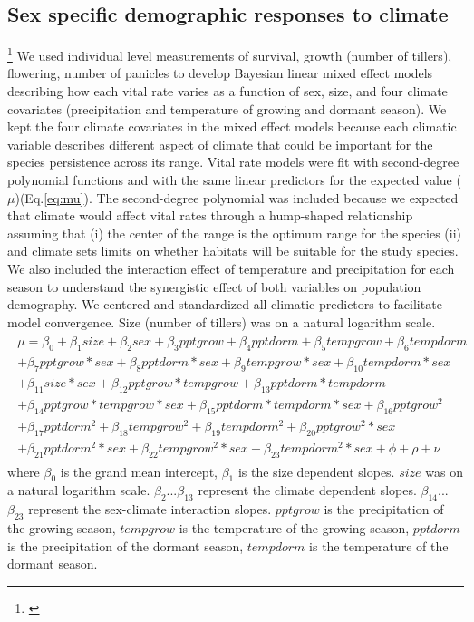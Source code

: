 \documentclass[12pt]{article}
\newcommand{\jacob}[2]{{\color{blue}{#1}}\footnote{\textit{\color{blue}{#2}}}}
\begin{document}
\subsection*{Sex specific demographic responses to climate}
\jacob{}{ I have reduced the redundancy between the two paragraphs and added the biological rationale for the model.  I hope that the explaination I added provided a clarification about why I did not use model selection.}
We used individual level measurements of survival, growth (number of tillers), flowering, number of panicles to develop Bayesian linear mixed effect models describing how each vital rate varies as a function of sex, size, and four climate covariates (precipitation and temperature of growing and dormant season). 
We kept the four climate covariates in the mixed effect models because each climatic variable describes different aspect of climate that could be important for the species persistence across its range. 
Vital rate models were fit with second-degree polynomial functions and with the same linear predictors for the expected value ($\mu$)(Eq.\ref{eq:mu}).
The second-degree polynomial was included because we expected that climate would affect vital rates through a hump-shaped relationship assuming that (i) the center of the range is the optimum range for the species (ii) and climate sets limits on whether habitats will be suitable for the study species.
We also included the interaction effect of temperature and precipitation for each season to understand the synergistic effect of both variables on population demography. 
We centered and standardized all climatic predictors to facilitate model convergence.
Size (number of tillers) was on a natural logarithm scale. 
\begin{align}\label{eq:mu}
\begin{split}
\mu = \beta_{0} + \beta_{1}size + \beta_{2}sex + \beta_{3}pptgrow + \beta_{4}pptdorm + \beta_{5}tempgrow + \beta_{6}tempdorm \\ 
+ \beta_{7}pptgrow*sex + \beta_{8}pptdorm*sex + \beta_{9}tempgrow*sex + \beta_{10}tempdorm*sex  \\ 
+  \beta_{11}size*sex + \beta_{12}pptgrow*tempgrow + \beta_{13}pptdorm*tempdorm\\
+ \beta_{14}pptgrow*tempgrow*sex + \beta_{15}pptdorm*tempdorm*sex + \beta_{16}pptgrow^2\\
+ \beta_{17}pptdorm^2 + \beta_{18}tempgrow^2 + \beta_{19}tempdorm^2 + \beta_{20}pptgrow^2*sex  \\
+ \beta_{21}pptdorm^2*sex + \beta_{22}tempgrow^2*sex + \beta_{23}tempdorm^2*sex + \phi + \rho + \nu 
\end{split}
\end{align}
\noindent where $\beta_{0}$ is the  grand mean intercept, $\beta_{1}$ is the size dependent slopes.
$size$ was on a natural logarithm scale. 
$\beta_{2}$...$\beta_{13}$ represent the climate dependent slopes.
$\beta_{14}$...$\beta_{23}$ represent the sex-climate interaction slopes.
$pptgrow$ is the precipitation of the growing season, $tempgrow$ is the temperature of the growing season, $pptdorm$ is the precipitation of the dormant season, $tempdorm$ is the temperature of the dormant season.
\end{document}
